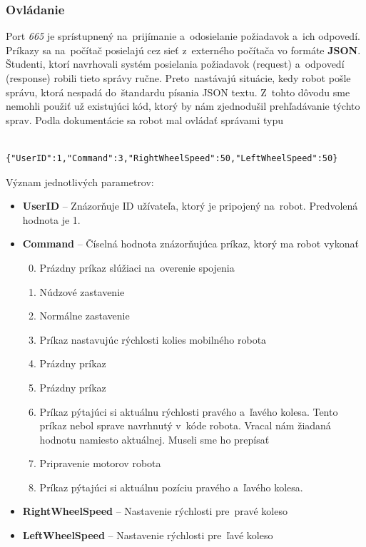 \subsubsection{Ovládanie}

Port \textit{665} je sprístupnený na~prijímanie a~odosielanie požiadavok a~ich odpovedí. Príkazy sa na~počítač posielajú cez sieť z~externého počítača vo formáte
\textbf{JSON}. Študenti, ktorí navrhovali systém posielania požiadavok (request) a~odpovedí (response) robili tieto správy ručne. Preto~nastávajú situácie, kedy
robot pošle správu, ktorá nespadá do~štandardu písania JSON textu. Z~tohto dôvodu sme nemohli použiť už existujúci kód, ktorý by nám zjednodušil prehľadávanie
týchto sprav. Podla dokumentácie sa robot mal ovládať správami typu~\cite{BMdoc}

\label{jsonSpeedRequestBad}
\begin{lstlisting}
		{"UserID":1,"Command":3,"RightWheelSpeed":50,"LeftWheelSpeed":50}
\end{lstlisting}

\noindent Význam jednotlivých parametrov:
\begin{itemize}
	\item \textbf{UserID} -- Znázorňuje ID užívateľa, ktorý je pripojený na~robot. Predvolená hodnota je 1.
	\item \textbf{Command} --  Číselná hodnota znázorňujúca príkaz, ktorý ma robot vykonať
		\begin{enumerate}
			\setcounter{enumi}{-1}
			\item \label{c0} Prázdny príkaz slúžiaci na~overenie spojenia
			\item \label{c1} Núdzové zastavenie
			\item \label{c2} Normálne zastavenie
			\item \label{c3} Príkaz nastavujúc rýchlosti kolies mobilného robota
			\item \label{c4} Prázdny príkaz
			\item \label{c5} Prázdny príkaz
			\item \label{c6} Príkaz pýtajúci si aktuálnu rýchlosti pravého a~ľavého kolesa. Tento príkaz nebol sprave navrhnutý v~kóde robota. Vracal nám žiadaná hodnotu
				namiesto aktuálnej. Museli sme ho prepísať
			\item \label{c7} Pripravenie motorov robota
			\item \label{c8} Príkaz pýtajúci si aktuálnu pozíciu pravého a~ľavého kolesa.
		\end{enumerate}
	\item \textbf{RightWheelSpeed} -- Nastavenie rýchlosti pre~pravé koleso
	\item \textbf{LeftWheelSpeed} -- Nastavenie rýchlosti pre~ľavé koleso
\end{itemize}

